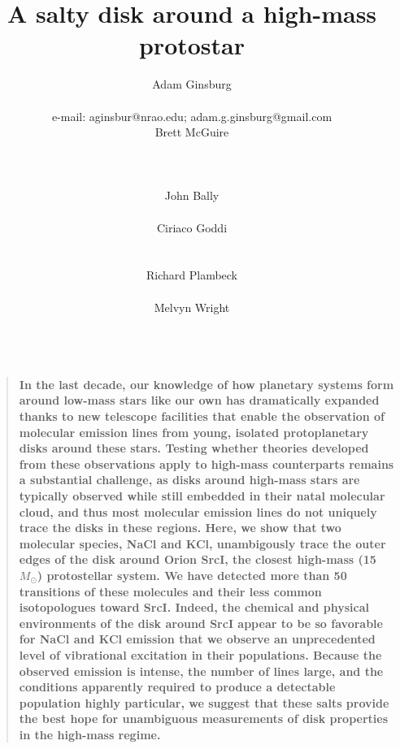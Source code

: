 \documentclass[12pt]{article}
\date{}
\author{
Adam Ginsburg\\
\nraojansky\\
e-mail: aginsbur@nrao.edu; adam.g.ginsburg@gmail.com\\
Brett McGuire\\
\hubble\\
\nraocv\\
\cfa\\
John Bally\\
\casa\\
Ciriaco Goddi\\
\allegro\\
\radboud\\
Richard Plambeck\\
\berkeley\\
Melvyn Wright\\
\berkeley\\
}
\title{A salty disk around a high-mass protostar}
\newenvironment{sciabstract}{%
\begin{quote} \bf  }
{\end{quote}}
\newcommand{\bam}[1]{\textcolor{green!65!black}{\textbf{[BAM: #1]}}}
\newcommand{\sourcei}{SrcI\xspace}
\newcommand{\msun}{\ensuremath{M_{\odot}}\xspace}			%
\begin{document}


\maketitle

\begin{sciabstract}
 In the last decade, our knowledge of how planetary systems form around
 low-mass stars like our own has dramatically expanded thanks to new telescope
 facilities that enable the observation of molecular emission lines from young,
 isolated protoplanetary disks around these stars.  Testing whether theories
 developed from these observations apply to high-mass counterparts remains a
 substantial challenge, as disks around high-mass stars are typically observed
 while still embedded in their natal molecular cloud, and thus most molecular
 emission lines do not uniquely trace the disks in these regions. Here, we show
 that two molecular species, NaCl and KCl, unambigously trace the outer edges
 of the disk around Orion \sourcei, the closest high-mass (15~\msun)
 protostellar system.  We have detected more than 50 transitions of these
 molecules and their less common isotopologues toward \sourcei.  Indeed, the
 chemical and physical environments of the disk around \sourcei appear to be so
 favorable for NaCl and KCl emission that we observe an unprecedented level of
 vibrational excitation in their populations.  Because the observed emission is
 intense, the number of lines large, and the conditions apparently required to
 produce a detectable population highly particular, we suggest that these salts
 provide the best hope for unambiguous measurements of disk properties in the
 high-mass regime. 
\end{sciabstract}


 
\end{document}
